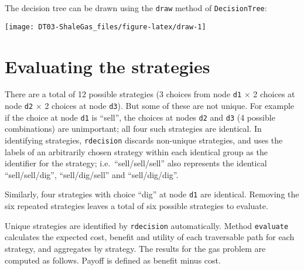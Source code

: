 \documentclass[
]{article}
\newenvironment{Shaded}{\begin{snugshade}}{\end{snugshade}}
\newcommand{\CommentTok}[1]{\textcolor[rgb]{0.56,0.35,0.01}{\textit{#1}}}
\newcommand{\DataTypeTok}[1]{\textcolor[rgb]{0.13,0.29,0.53}{#1}}
\newcommand{\DecValTok}[1]{\textcolor[rgb]{0.00,0.00,0.81}{#1}}
\newcommand{\KeywordTok}[1]{\textcolor[rgb]{0.13,0.29,0.53}{\textbf{#1}}}
\newcommand{\NormalTok}[1]{#1}
\newcommand{\OperatorTok}[1]{\textcolor[rgb]{0.81,0.36,0.00}{\textbf{#1}}}
\newcommand{\StringTok}[1]{\textcolor[rgb]{0.31,0.60,0.02}{#1}}
\begin{document}
\begin{Shaded}
\end{Shaded}

The decision tree can be drawn using the \texttt{draw} method of
\texttt{DecisionTree}:

\begin{center}\texttt{[image: DT03-ShaleGas\_files/figure-latex/draw-1]} \end{center}

\hypertarget{evaluating-the-strategies}{%
\section{Evaluating the strategies}\label{evaluating-the-strategies}}

There are a total of 12 possible strategies (3 choices from node
\texttt{d1} \(\times\) 2 choices at node \texttt{d2} \(\times\) 2
choices at node \texttt{d3}). But some of these are not unique. For
example if the choice at node \texttt{d1} is ``sell'', the choices at
nodes \texttt{d2} and \texttt{d3} (4 possible combinations) are
unimportant; all four such strategies are identical. In identifying
strategies, \texttt{rdecision} discards non-unique strategies, and uses
the labels of an arbitrarily chosen strategy within each identical group
as the identifier for the strategy; i.e.~``sell/sell/sell'' also
represents the identical ``sell/sell/dig'', ``sell/dig/sell'' and
``sell/dig/dig''.

Similarly, four strategies with choice ``dig'' at node \texttt{d1} are
identical. Removing the six repeated strategies leaves a total of six
possible strategies to evaluate.

Unique strategies are identified by \texttt{rdecision} automatically.
Method \texttt{evaluate} calculates the expected cost, benefit and
utility of each traversable path for each strategy, and aggregates by
strategy. The results for the gas problem are computed as follows.
Payoff is defined as benefit minus cost.
\end{document}
